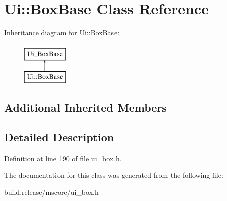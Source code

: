\hypertarget{class_ui_1_1_box_base}{}\section{Ui\+:\+:Box\+Base Class Reference}
\label{class_ui_1_1_box_base}
Inheritance diagram for Ui\+:\+:Box\+Base\+:\begin{figure}[H]
\begin{center}
\leavevmode
\includegraphics[height=2.000000cm]{class_ui_1_1_box_base}
\end{center}
\end{figure}
\subsection*{Additional Inherited Members}


\subsection{Detailed Description}


Definition at line 190 of file ui\+\_\+box.\+h.



The documentation for this class was generated from the following file\+:\begin{DoxyCompactItemize}
\item 
build.\+release/mscore/ui\+\_\+box.\+h\end{DoxyCompactItemize}
